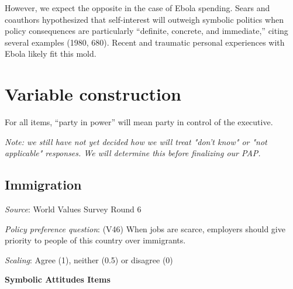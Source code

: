 \documentclass[]{article}
\begin{document}
However, we expect the opposite in the case of Ebola spending. Sears and
coauthors hypothesized that self-interest will outweigh symbolic
politics when policy consequences are particularly ``definite, concrete,
and immediate,'' citing several examples (1980, 680). Recent and
traumatic personal experiences with Ebola likely fit this mold.

\section{Variable construction}\label{variable-construction}

For all items, ``party in power'' will mean party in control of the
executive.

\textit{Note: we still have not yet decided how we will treat "don't know" or "not applicable" responses. We will determine this before finalizing our PAP.}

\subsection{Immigration}\label{immigration}

\textit{Source}: World Values Survey Round 6

\textit{Policy preference question}: (V46) When jobs are scarce,
employers should give priority to people of this country over
immigrants.

\textit{Scaling}: Agree (1), neither (0.5) or disagree (0)

\textbf{Symbolic Attitudes Items}
\end{document}
